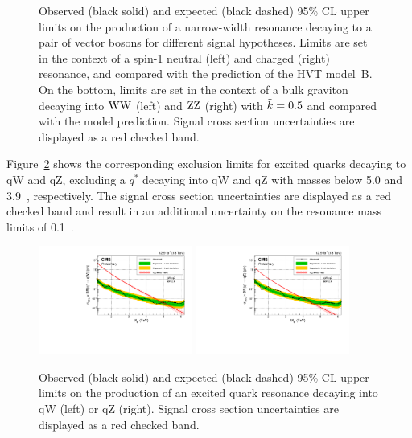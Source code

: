 \begin{figure}[h!]
\caption{Observed (black solid) and expected (black dashed) 95\% CL upper limits on the production of a narrow-width resonance decaying to a pair of vector bosons for different signal hypotheses. Limits are set in the context of a spin-1 neutral \PZpr (left) and charged \PWpr (right) resonance, and compared with the prediction of the HVT model~B. On the bottom, limits are set in the context of a bulk graviton decaying into $\mathrm{W}\mathrm{W}$ (left) and $\mathrm{Z}\mathrm{Z}$ (right) with $\tilde{k} =0.5$ and compared with the model prediction. Signal cross section uncertainties are displayed as a red checked band.}
\label{fig:searchII:limitCombined}
\end{figure}
\noindent Figure~\ref{fig:searchII:limitCombined_qV} shows the corresponding exclusion limits for excited quarks decaying to qW and qZ, excluding a $q^*$ decaying into qW and qZ with masses below 5.0 and 3.9~\TeV, respectively. The signal cross section uncertainties are displayed as a red checked band and result in an additional uncertainty on the resonance mass limits of 0.1~\TeV.
\begin{figure}[h!]
\centering
     \includegraphics[width=0.45\textwidth]{figures/analysis/search2/B2G-16-021/figures/limits/brazilianFlag_qW_new_combined_13TeV.pdf}
     \includegraphics[width=0.45\textwidth]{figures/analysis/search2/B2G-16-021/figures/limits/brazilianFlag_qZ_new_combined_13TeV.pdf}\\
\caption{Observed (black solid) and expected (black dashed) 95\% CL upper limits on the production of an excited quark resonance
decaying into qW (left) or qZ (right). Signal cross section uncertainties are displayed as a red checked band.}
\label{fig:searchII:limitCombined_qV}
\end{figure}
